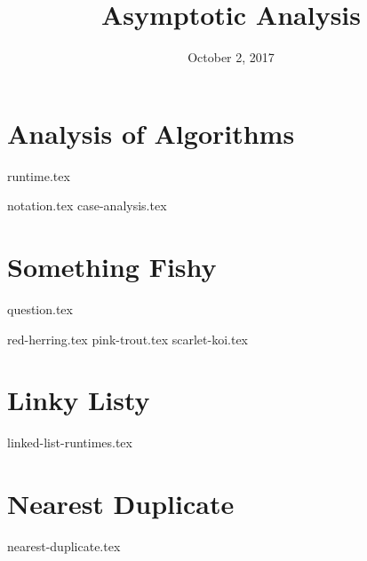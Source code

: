 \documentclass[11pt]{exam}
\title{Asymptotic Analysis}
\date{October 2, 2017}
\begin{document}
\maketitle

\section{Analysis of Algorithms}
{runtime.tex}
\begin{questions}
{notation.tex}
{case-analysis.tex}
\end{questions}

\section{Something Fishy}
{question.tex}
\begin{questions}
{red-herring.tex}
{pink-trout.tex}
{scarlet-koi.tex}
\end{questions}

\section{Linky Listy}
\begin{questions}
{linked-list-runtimes.tex}
\end{questions}

\section{Nearest Duplicate}
\begin{questions}
{nearest-duplicate.tex}
\end{questions}
\end{document}
